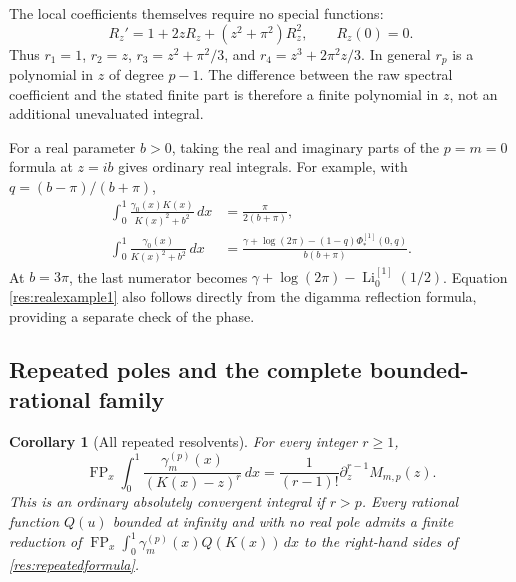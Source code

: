 \documentclass[11pt,a4paper]{article}
\numberwithin{equation}{section}
\newtheorem{corollary}[theorem]{Corollary}
\theoremstyle{definition}
\theoremstyle{remark}
\DeclareMathOperator{\Li}{Li}
\begin{document}
The local coefficients themselves require no special functions:
\begin{equation}\label{res:riccati}
 R_z'=1+2zR_z+(z^2+\pi^2)R_z^2,\qquad R_z(0)=0.
\end{equation}
Thus $r_1=1$, $r_2=z$, $r_3=z^2+\pi^2/3$, and
$r_4=z^3+2\pi^2z/3$. In general $r_p$ is a polynomial in $z$
of degree $p-1$. The difference between the raw spectral coefficient
and the stated finite part is therefore a finite polynomial in $z$,
not an additional unevaluated integral.

For a real parameter $b>0$, taking the real and imaginary parts of
the $p=m=0$ formula at $z=ib$ gives ordinary real integrals. For example,
with $q=(b-\pi)/(b+\pi)$,
\begin{align}
 \int_0^1\frac{\gamma_0(x)K(x)}{K(x)^2+b^2}\,dx
       &=\frac{\pi}{2(b+\pi)},\label{res:realexample1}\\
 \int_0^1\frac{\gamma_0(x)}{K(x)^2+b^2}\,dx
       &=\frac{\gamma+\log(2\pi)
                   -(1-q)\Phi_*^{[1]}(0,q)}{b(b+\pi)}.
       \label{res:realexample2}
\end{align}
At $b=3\pi$, the last numerator becomes
$\gamma+\log(2\pi)-\Li_0^{[1]}(1/2)$.
Equation \eqref{res:realexample1} also follows directly from the
digamma reflection formula, providing a separate check of the phase.

\subsection{Repeated poles and the complete bounded-rational family}

\begin{corollary}[All repeated resolvents]\label{res:repeated}
For every integer $r\ge1$,
\begin{equation}\label{res:repeatedformula}
 \operatorname{FP}_x\int_0^1
       \frac{\gamma_m^{(p)}(x)}{(K(x)-z)^r}\,dx
       =\frac1{(r-1)!}\partial_z^{r-1}M_{m,p}(z).
\end{equation}
This is an ordinary absolutely convergent integral if $r>p$.
Every rational function $Q(u)$ bounded at infinity and with no real pole admits
a finite reduction of
$\operatorname{FP}_x\int_0^1\gamma_m^{(p)}(x)Q(K(x))\,dx$
to the right-hand sides of \eqref{res:repeatedformula}.
\end{corollary}
\end{document}

